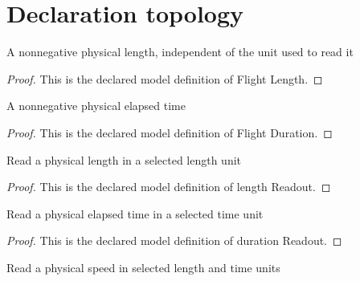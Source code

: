 \section{Declaration topology}
\begin{definition}
  \label{def:physics:phyx-mini-0731:phyxminiproblems-problemphyxmini0731-flightlength}
  A nonnegative physical length, independent of the unit used to read it
\end{definition}
\begin{proof}
  This is the declared model definition of Flight Length.
\end{proof}
\begin{definition}
  \label{def:physics:phyx-mini-0731:phyxminiproblems-problemphyxmini0731-flightduration}
  A nonnegative physical elapsed time
\end{definition}
\begin{proof}
  This is the declared model definition of Flight Duration.
\end{proof}
\begin{definition}
  \label{def:physics:phyx-mini-0731:phyxminiproblems-problemphyxmini0731-lengthreadout}
  Read a physical length in a selected length unit
\end{definition}
\begin{proof}
  This is the declared model definition of length Readout.
\end{proof}
\begin{definition}
  \label{def:physics:phyx-mini-0731:phyxminiproblems-problemphyxmini0731-durationreadout}
  Read a physical elapsed time in a selected time unit
\end{definition}
\begin{proof}
  This is the declared model definition of duration Readout.
\end{proof}
\begin{definition}
  \label{def:physics:phyx-mini-0731:phyxminiproblems-problemphyxmini0731-speedreadout}
  Read a physical speed in selected length and time units
\end{definition}
